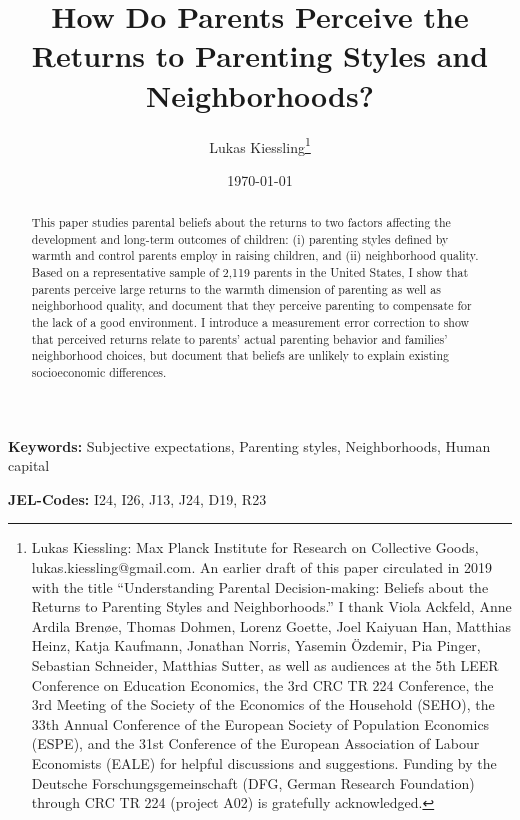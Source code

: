 \documentclass[12pt, a4paper, english]{article}
\date{}
\begin{document}
\begin{titlepage}

\title{How Do Parents Perceive the Returns to Parenting Styles and Neighborhoods?}

\author{
Lukas Kiessling\thanks{Lukas Kiessling: Max Planck Institute for Research on Collective Goods, lukas.kiessling@gmail.com. An earlier draft of this paper circulated in 2019 with the title ``Understanding Parental Decision-making: Beliefs about the Returns to Parenting Styles and Neighborhoods.'' I thank Viola Ackfeld, Anne Ardila Bren\o e, Thomas Dohmen, Lorenz Goette, Joel Kaiyuan Han, Matthias Heinz, Katja Kaufmann, Jonathan Norris, Yasemin Özdemir, Pia Pinger, Sebastian Schneider, Matthias Sutter, as well as audiences at the 5th LEER Conference on Education Economics, the 3rd CRC TR 224 Conference, the 3rd Meeting of the Society of the Economics of the Household (SEHO), the 33th Annual Conference of the European Society of Population Economics (ESPE), and the 31st Conference of the European Association of Labour Economists (EALE) for helpful discussions and suggestions. Funding by the Deutsche Forschungsgemeinschaft (DFG, German Research Foundation) through CRC TR 224 (project A02) is gratefully acknowledged.}
}


\date{
\today
}

\vspace{-1cm}
\maketitle
\thispagestyle{empty}
\vspace{-1cm}
\begin{abstract}\singlespacing
    \noindent 
    This paper studies parental beliefs about the returns to two factors affecting the development and long-term outcomes of children: (i) parenting styles defined by warmth and control parents employ in raising children, and (ii) neighborhood quality. Based on a representative sample of 2,119 parents in the United States, I show that parents perceive large returns to the warmth dimension of parenting as well as neighborhood quality, and document that they perceive parenting to compensate for the lack of a good environment. I introduce a measurement error correction to show that perceived returns relate to parents' actual parenting behavior and families' neighborhood choices, but document that beliefs are unlikely to explain existing socioeconomic differences.
\end{abstract}


\small
\textbf{Keywords:} Subjective expectations, Parenting styles, Neighborhoods, Human capital

\textbf{JEL-Codes:} I24, I26, J13, J24, D19, R23

\normalsize
\end{titlepage}
\end{document}

